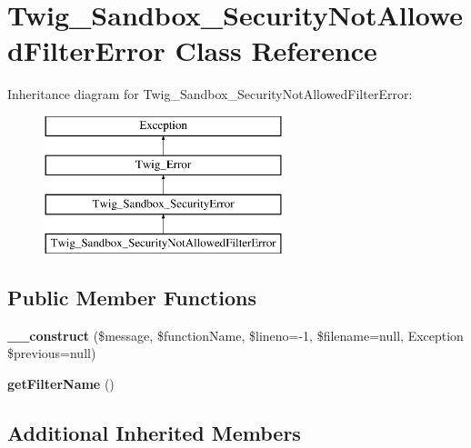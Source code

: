 \hypertarget{class_twig___sandbox___security_not_allowed_filter_error}{}\section{Twig\+\_\+\+Sandbox\+\_\+\+Security\+Not\+Allowed\+Filter\+Error Class Reference}
\label{class_twig___sandbox___security_not_allowed_filter_error}
Inheritance diagram for Twig\+\_\+\+Sandbox\+\_\+\+Security\+Not\+Allowed\+Filter\+Error\+:\begin{figure}[H]
\begin{center}
\leavevmode
\includegraphics[height=4.000000cm]{class_twig___sandbox___security_not_allowed_filter_error}
\end{center}
\end{figure}
\subsection*{Public Member Functions}
\begin{DoxyCompactItemize}
\item 
\hypertarget{class_twig___sandbox___security_not_allowed_filter_error_a298d4f275321abb754e9ec89d847fc4c}{}{\bfseries \+\_\+\+\_\+construct} (\$message, \$function\+Name, \$lineno=-\/1, \$filename=null, Exception \$previous=null)\label{class_twig___sandbox___security_not_allowed_filter_error_a298d4f275321abb754e9ec89d847fc4c}

\item 
\hypertarget{class_twig___sandbox___security_not_allowed_filter_error_ab02e143afc00e7cd0e9e4c299ebbb2b1}{}{\bfseries get\+Filter\+Name} ()\label{class_twig___sandbox___security_not_allowed_filter_error_ab02e143afc00e7cd0e9e4c299ebbb2b1}

\end{DoxyCompactItemize}
\subsection*{Additional Inherited Members}


